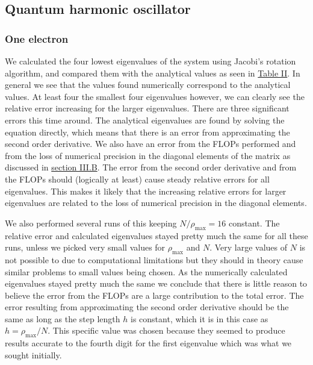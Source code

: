\documentclass[reprint,english,notitlepage]{revtex4-1}  %
\begin{document}
\subsection{Quantum harmonic oscillator} \label{sec:V:b}

\subsubsection{One electron} \label{sec:V:b:i}

We calculated the four lowest eigenvalues of the system using Jacobi's rotation algorithm, and compared them with the analytical values as seen in \hyperref[table:IV:b:1]{Table II}. In general we see that the values found numerically correspond to the analytical values. At least four the smallest four eigenvalues however, we can clearly see the relative error increasing for the larger eigenvalues. There are three significant errors this time around. The analytical eigenvalues are found by solving the equation directly, which means that there is an error from approximating the second order derivative. We also have an error from the FLOPs performed and from the loss of numerical precision in the diagonal elements of the matrix as discussed in \hyperref[sec:III:b]{section III.B}. The error from the second order derivative and from the FLOPs should (logically at least) cause steady relative errors for all eigenvalues. This makes it likely that the increasing relative errors for larger eigenvalues are related to the loss of numerical precision in the diagonal elements.

We also performed several runs of this keeping $N/\rho_\text{max} = 16$ constant. The relative error and calculated eigenvalues stayed pretty much the same for all these runs, unless we picked very small values for $\rho_\text{max}$ and $N$. Very large values of $N$ is not possible to due to computational limitations but they should in theory cause similar problems to small values being chosen. As the numerically calculated eigenvalues stayed pretty much the same we conclude that there is little reason to believe the error from the FLOPs are a large contribution to the total error. The error resulting from approximating the second order derivative should be the same as long as the step length $h$ is constant, which it is in this case as $h = \rho_\text{max}/N$. This specific value was chosen because they seemed to produce results accurate to the fourth digit for the first eigenvalue which was what we sought initially.
\end{document}
